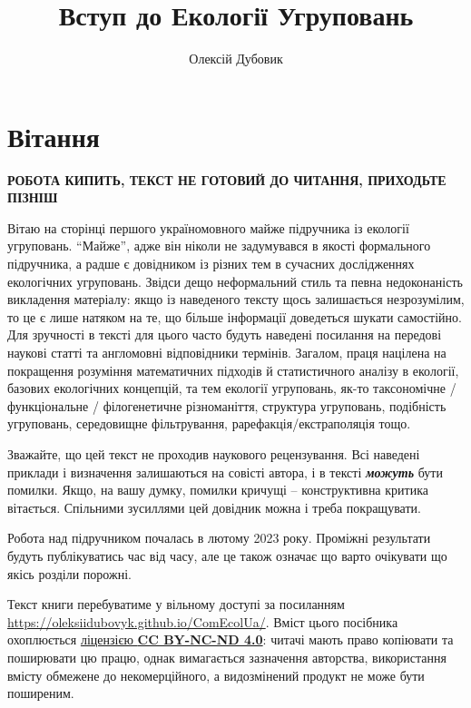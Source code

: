 \documentclass[
  11pt,
]{book}
\title{Вступ до Екології Угруповань}
\author{Олексій Дубовик}
\date{}
\begin{document}
\maketitle

{
\setcounter{tocdepth}{1}
\tableofcontents
}
\chapter*{Вітання}\label{ux432ux456ux442ux430ux43dux43dux44f}

\textbf{{РОБОТА КИПИТЬ, ТЕКСТ НЕ ГОТОВИЙ ДО ЧИТАННЯ, ПРИХОДЬТЕ ПІЗНІШ}}

Вітаю на сторінці першого україномовного майже підручника із екології угруповань. ``Майже'', адже він ніколи не задумувався в якості формального підручника, а радше є довідником із різних тем в сучасних дослідженнях екологічних угруповань. Звідси дещо неформальний стиль та певна недоконаність викладення матеріалу: якщо із наведеного тексту щось залишається незрозумілим, то це є лише натяком на те, що більше інформації доведеться шукати самостійно. Для зручності в тексті для цього часто будуть наведені посилання на передові наукові статті та англомовні відповідники термінів. Загалом, праця націлена на покращення розуміння математичних підходів й статистичного аналізу в екології, базових екологічних концепцій, та тем екології угруповань, як-то таксономічне / функціональне / філогенетичне різноманіття, структура угруповань, подібність угруповань, середовищне фільтрування, рарефакція/екстраполяція тощо.

Зважайте, що цей текст не проходив наукового рецензування. Всі наведені приклади і визначення залишаються на совісті автора, і в тексті \textbf{\emph{можуть}} бути помилки. Якщо, на вашу думку, помилки кричущі -- конструктивна критика вітається. Спільними зусиллями цей довідник можна і треба покращувати.

Робота над підручником почалась в лютому 2023 року. Проміжні результати будуть публікуватись час від часу, але це також означає що варто очікувати що якісь розділи порожні.

Текст книги перебуватиме у вільному доступі за посиланням \url{https://oleksiidubovyk.github.io/ComEcolUa/}. Вміст цього посібника охоплюється \href{https://creativecommons.org/licenses/by-nc-nd/4.0/deed.en}{ліцензією \textbf{CC BY-NC-ND 4.0}}: читачі мають право копіювати та поширювати цю працю, однак вимагається зазначення авторства, використання вмісту обмежене до некомерційного, а видозмінений продукт не може бути поширеним.
\end{document}

